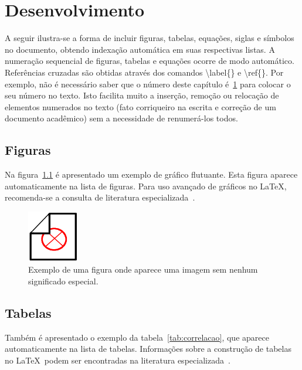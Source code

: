 \documentclass{abnt-UTFPR} %
\begin{document}
\chapter{Desenvolvimento}
\label{chap:desenv}

A seguir ilustra-se a forma de incluir figuras, tabelas, equa\c{c}\~oes, siglas e s\'imbolos no documento, obtendo indexa\c{c}\~ao autom\'atica em suas respectivas listas. A numera\c{c}\~ao sequencial de figuras, tabelas e equa\c{c}\~oes ocorre de modo autom\'atico. Refer\^encias cruzadas s\~ao obtidas atrav\'es dos comandos {\ttfamily \textbackslash label\{\}} e {\ttfamily \textbackslash ref\{\}}. Por exemplo, n\~ao \'e necess\'ario saber que o n\'umero deste cap\'itulo \'e~\ref{chap:desenv} para colocar o seu n\'umero no texto. Isto facilita muito a inser\c{c}\~ao, remo\c{c}\~ao ou reloca\c{c}\~ao de elementos numerados no texto (fato corriqueiro na escrita e corre\c{c}\~ao de um documento acad\^emico) sem a necessidade de renumer\'a-los todos.

\section{Figuras}

Na figura~\ref{fig:dummy} \'e apresentado um exemplo de gr\'afico flutuante. Esta figura aparece automaticamente na lista de figuras. Para uso avan\c{c}ado de gr\'aficos no \LaTeX, recomenda-se a consulta de literatura especializada~\cite{Goossens2007}.

\begin{figure}[!htb]
	\centering
	\includegraphics[width=0.2\textwidth]{./figs/dummy.png} %
	\caption[Exemplo de uma figura]{Exemplo de uma figura onde aparece uma imagem sem nenhum significado especial.}
	\label{fig:dummy}
\end{figure}

\section{Tabelas}

Tamb\'em \'e apresentado o exemplo da tabela~\ref{tab:correlacao}, que aparece automaticamente na lista de tabelas. Informa\c{c}\~oes sobre a constru\c{c}\~ao de tabelas no \LaTeX\ podem ser encontradas na literatura especializada~\cite{Lamport1986,Buerger1989,Kopka2003,Mittelbach2004}.
\end{document}
